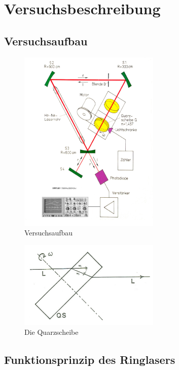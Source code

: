 \section{Versuchsbeschreibung}

\subsection{Versuchsaufbau}

\begin{figure}[H]
	\centering \includegraphics[width=0.6\textwidth]{Bilder/aufbau.jpg}
	\caption{Versuchsaufbau}
\end{figure}

\begin{figure}[H]
	\centering \includegraphics[width=0.6\textwidth]{Bilder/wiwr.jpg}
	\caption{Die Quarzscheibe}
\end{figure}

\subsection{Funktionsprinzip des Ringlasers}

